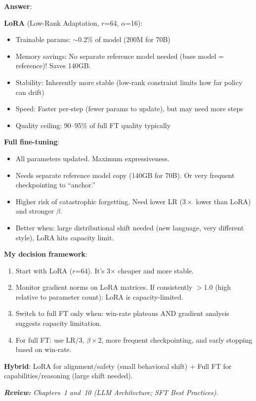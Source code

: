 \begin{questionbox}
\textbf{Answer}:

\textbf{LoRA} (Low-Rank Adaptation, $r$=64, $\alpha$=16):

\begin{itemize}
  \item Trainable params: $\sim$0.2\% of model (200M for 70B)
  \item Memory savings: No separate reference model needed (base model = reference)! Saves 140GB.
  \item Stability: Inherently more stable (low-rank constraint limits how far policy can drift)
  \item Speed: Faster per-step (fewer params to update), but may need more steps
  \item Quality ceiling: 90--95\% of full FT quality typically
\end{itemize}

\textbf{Full fine-tuning}:

\begin{itemize}
  \item All parameters updated. Maximum expressiveness.
  \item Needs separate reference model copy (140GB for 70B). Or very frequent checkpointing to ``anchor.''
  \item Higher risk of catastrophic forgetting. Need lower LR ($3\times$ lower than LoRA) and stronger $\beta$.
  \item Better when: large distributional shift needed (new language, very different style), LoRA hits capacity limit.
\end{itemize}

\textbf{My decision framework}:

\begin{enumerate}
  \item Start with LoRA ($r$=64). It’s 3$\times$ cheaper and more stable.
  \item Monitor gradient norms on LoRA matrices. If consistently $>$1.0 (high relative to parameter count): LoRA is capacity-limited.
  \item Switch to full FT only when: win-rate plateaus AND gradient analysis suggests capacity limitation.
  \item For full FT: use $\text{LR}/3$, $\beta \times 2$, more frequent checkpointing, and early stopping based on win-rate.
\end{enumerate}

\textbf{Hybrid}: LoRA for alignment/safety (small behavioral shift) + Full FT for capabilities/reasoning (large shift needed).

\emph{\textbf{Review:} Chapters~1 and~10 (LLM Architecture; SFT Best Practices).}
\end{questionbox}

